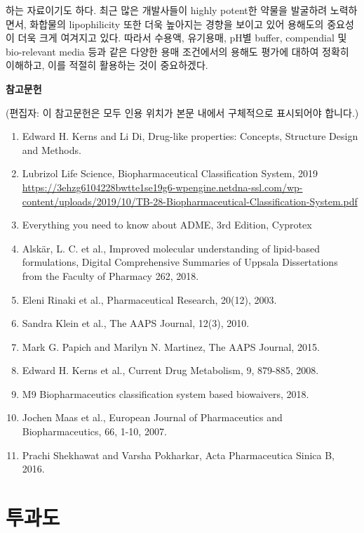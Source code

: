 \documentclass[
  11pt,
  krantz2, a4paper, twoside]{krantz}
\providecommand{\tightlist}{%
  \setlength{\itemsep}{0pt}\setlength{\parskip}{0pt}}
\begin{document}
하는 자료이기도 하다.
최근 많은 개발사들이 highly potent한 약물을 발굴하려 노력하면서, 화합물의 lipophilicity 또한 더욱 높아지는 경향을 보이고 있어 용해도의 중요성이 더욱 크게 여겨지고 있다.
따라서 수용액, 유기용매, pH별 buffer, compendial 및 bio-relevant media 등과 같은 다양한 용매 조건에서의 용해도 평가에 대하여 정확히 이해하고, 이를 적절히 활용하는 것이 중요하겠다.

\textbf{참고문헌}

(편집자: 이 참고문헌은 모두 인용 위치가 본문 내에서 구체적으로 표시되어야 합니다.)

\begin{enumerate}
\def\labelenumi{\arabic{enumi}.}
\tightlist
\item
  Edward H. Kerns and Li Di, Drug-like properties: Concepts, Structure Design and Methods.
\item
  Lubrizol Life Science, Biopharmaceutical Classification System, 2019 \url{https://3ehzg6104228bwtte1se19g6-wpengine.netdna-ssl.com/wp-content/uploads/2019/10/TB-28-Biopharmaceutical-Classification-System.pdf}
\item
  Everything you need to know about ADME, 3rd Edition, Cyprotex
\item
  Alskär, L. C. et al., Improved molecular understanding of lipid-based formulations, Digital Comprehensive Summaries of Uppsala Dissertations from the Faculty of Pharmacy 262, 2018.
\item
  Eleni Rinaki et al., Pharmaceutical Research, 20(12), 2003.
\item
  Sandra Klein et al., The AAPS Journal, 12(3), 2010.
\item
  Mark G. Papich and Marilyn N. Martinez, The AAPS Journal, 2015.
\item
  Edward H. Kerns et al., Current Drug Metabolism, 9, 879-885, 2008.
\item
  M9 Biopharmaceutics classification system based biowaivers, 2018.
\item
  Jochen Maas et al., European Journal of Pharmaceutics and Biopharmaceutics, 66, 1-10, 2007.
\item
  Prachi Shekhawat and Varsha Pokharkar, Acta Pharmaceutica Sinica B, 2016.
\end{enumerate}

\hypertarget{uxd22cuxacfcuxb3c4}{%
\chapter{투과도}\label{uxd22cuxacfcuxb3c4}}
\end{document}
